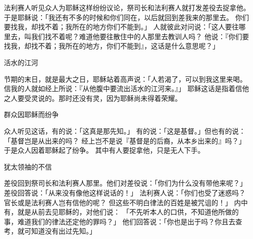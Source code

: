 {\par }{\PP {}法利赛人听见众人为耶稣这样纷纷议论，祭司长和法利赛人就打发差役去捉拿他。
于是耶稣说：「我还有不多的时候和你们同在，以后就回到差我来的那里去。
你们要找我，却找不着；我所在的地方你们不能到。」
人就彼此对问说：「这人要往哪里去，叫我们找不着呢？难道他要往散住{}中的{}人那里去教训{}人吗？
他说：『你们要找我，却找不着；我所在的地方，你们不能到』，这话是什么意思呢？」
\par }{\SH 活水的江河
\par }{\PP {}节期的末日，就是最大之日，耶稣站着高声说：「人若渴了，可以到我这里来喝。
信我的人就如经上所说：『从他腹中要流出活水的江河来。』」
耶稣这话是指着信他之人要受{}灵说的。那时还没有{}灵{}，因为耶稣尚未得着荣耀。
\par }{\SH 群众因耶稣而纷争
\par }{\PP {}众人听见这话，有的说：「这真是那先知。」
有的说：「这是基督。」但也有的说：「基督岂是从{}出来的吗？
经上岂不是说『基督是{}的后裔，从{}本乡{}出来的』吗？」
于是众人因着耶稣起了纷争。
其中有人要捉拿他，只是无人下手。
\par }{\SH 犹太领袖的不信
\par }{\PP {}差役回到祭司长和法利赛人那里。他们对差役说：「你们为什么没有带他来呢？」
差役回答说：「从来没有像他这样说话的！」
法利赛人说：「你们也受了迷惑吗？
官长或是法利赛人岂有信他的呢？
但这些不明白律法的百姓是被咒诅的！」
内中有{}，就是从前去见耶稣的，对他们说：
「不先听本人的口供，不知道他所做的事，难道我们的律法还定他的罪吗？」
他们回答说：「你也是出于{}吗？你且去查考，就可知道{}没有出过先知。」

}
